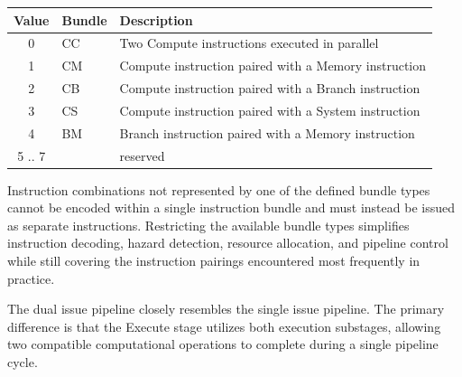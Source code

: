 \begin{center}
\begin{tabular}{c|l|l}
\textbf{Value} & \textbf{Bundle} & \textbf{Description} \\
\hline
0 & CC & Two Compute instructions executed in parallel \\
1 & CM & Compute instruction paired with a Memory instruction \\
2 & CB & Compute instruction paired with a Branch instruction \\
3 & CS & Compute instruction paired with a System instruction \\
4 & BM & Branch instruction paired with a Memory instruction \\
5 .. 7 & & reserved
\end{tabular}
\end{center}

Instruction combinations not represented by one of the defined bundle types cannot be encoded within a single instruction bundle and must instead be issued as separate instructions. Restricting the available bundle types simplifies instruction decoding, hazard detection, resource allocation, and pipeline control while still covering the instruction pairings encountered most frequently in practice.


The dual issue pipeline closely resembles the single issue pipeline. The primary difference is that the Execute stage utilizes both execution substages, allowing two compatible computational operations to complete during a single pipeline cycle.

